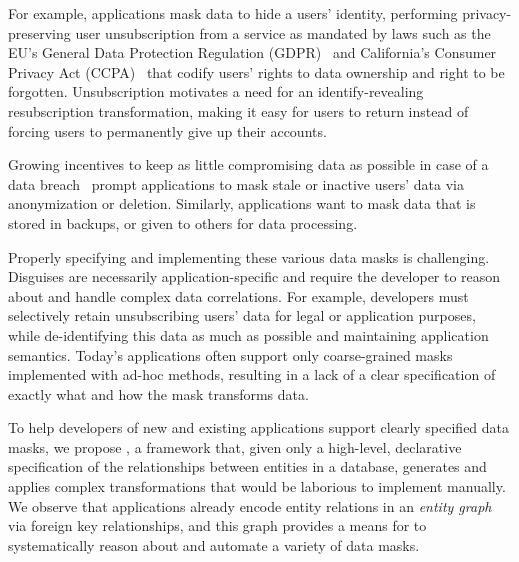 For example, applications mask data to hide a users' identity, performing privacy-preserving user
unsubscription from a service as mandated by laws such as the EU's General Data Protection
Regulation (GDPR)~\cite{eu:gdpr} and California's Consumer Privacy Act (CCPA)~\cite{ca:privacy-act}
that codify users' rights to data ownership and right to be forgotten. Unsubscription motivates a
need for an identify-revealing resubscription transformation, making it easy for users to return
instead of forcing users to permanently give up their accounts.

Growing incentives to keep as little compromising data as possible in case of a data
breach~\cite{breach:amazon,breach:twitter, breach:fb, breach:marriott, breach:quora} prompt
applications to mask stale or inactive users' data via anonymization or deletion. Similarly,
applications want to mask data that is stored in backups, or given to others for data processing.


Properly specifying and implementing these various data masks is challenging. Disguises are necessarily
application-specific and require the developer to reason about and handle complex data correlations.
For example, developers must selectively retain unsubscribing users' data for legal or application
purposes, while de-identifying this data as much as possible and maintaining application semantics.
Today's applications often support only coarse-grained masks implemented with ad-hoc methods,
resulting in a lack of a clear specification of exactly what and how the mask transforms data.

To help developers of new and existing applications support clearly specified data masks, we propose
\sys, a framework that, given only a high-level, declarative specification of the relationships
between entities in a database, generates and applies complex transformations that would be
laborious to implement manually. We observe that applications already encode entity
relations in an \emph{entity graph} via foreign key relationships, and this graph provides a means
for \sys to systematically reason about and automate a variety of data masks.

